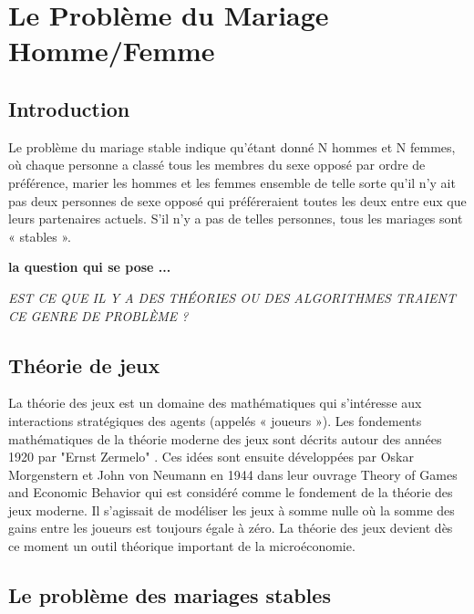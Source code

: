 \chapter{Le Problème du Mariage Homme/Femme}

\tableofcontents
\listoffigures 
\newpage
\section{Introduction}
	\par Le problème du mariage stable indique qu'étant donné N hommes et N femmes, où chaque personne a classé tous les membres du sexe opposé par ordre de préférence, marier les hommes et les femmes ensemble de telle sorte qu'il n'y ait pas deux personnes de sexe opposé qui préféreraient toutes les deux entre eux que leurs partenaires actuels. S'il n'y a pas de telles personnes, tous les mariages sont « stables ». \cite{intro_algo}
	
		\begin{flushleft}
		\textbf{la question qui se pose ... }
		\end{flushleft}
		\vspace{4cm}
	\begin{center}
		\textit{EST CE QUE IL Y A DES THÉORIES OU DES ALGORITHMES TRAIENT CE GENRE DE PROBLÈME ?}
	\end{center}
\newpage

\section{Théorie de jeux}
\par La théorie des jeux est un domaine des mathématiques qui s'intéresse aux interactions stratégiques des agents (appelés « joueurs »). Les fondements mathématiques de la théorie moderne des jeux sont décrits autour des années 1920 par "Ernst Zermelo" . Ces idées sont ensuite développées par Oskar Morgenstern et John von Neumann en 1944 dans leur ouvrage Theory of Games and Economic Behavior qui est considéré comme le fondement de la théorie des jeux moderne. Il s'agissait de modéliser les jeux à somme nulle où la somme des gains entre les joueurs est toujours égale à zéro. La théorie des jeux devient dès ce moment un outil théorique important de la microéconomie.\cite{tj}

\section{Le problème des mariages stables}

